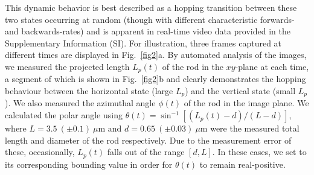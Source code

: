 \documentclass[aps,prl,twocolumn,superscriptaddress]{revtex4-1}
\begin{document}
This dynamic behavior is best described as a hopping transition between these two states occurring at random (though with different characteristic forwards- and backwards-rates) and is apparent in real-time video data provided in the Supplementary Information (SI). For illustration, three frames captured at different times are displayed in Fig.\ \ref{fig2}a. By automated analysis of the images, we measured the projected length $L_p(t)$ of the rod in the $xy$-plane at each time, a segment of which is shown in Fig.\ \ref{fig2}b and clearly demonstrates the hopping behaviour between the horizontal state (large $L_p$) and the vertical state (small $L_p$). We also measured the azimuthal angle $\phi(t)$ of the rod in the image plane. We calculated the polar angle using $\theta(t) = \sin^{-1}{[(L_p(t)- d)/(L - d)]}$, where $L=3.5\ (\pm0.1)\ \mu$m and $d=0.65\ (\pm0.03)\ \mu$m were the measured total length and diameter of the rod respectively. Due to the measurement error of these, occasionally, $L_p(t)$ falls out of the range $[d, L]$. In these cases, we set to its corresponding bounding value in order for $\theta(t)$ to remain real-positive.
\end{document}
